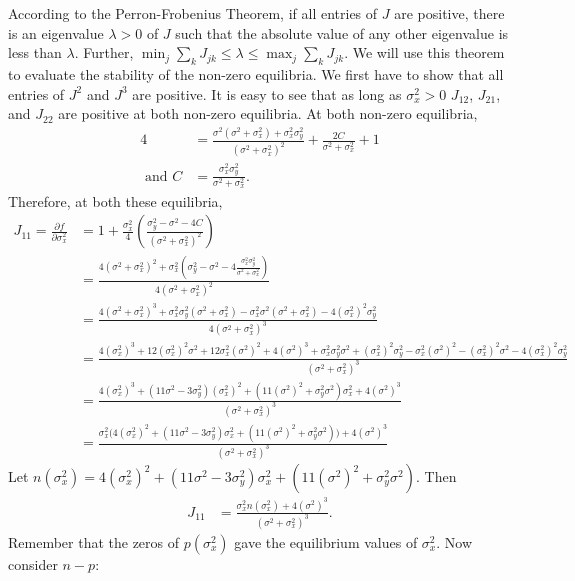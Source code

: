 \documentclass{article}
\begin{document}
\begin{enumerate}
According to the Perron-Frobenius Theorem, if all entries of $J$ are positive, there is an eigenvalue $\lambda>0$ of $J$ such that the absolute value of any other eigenvalue is less than $\lambda$. Further, $\min_j\sum_k J_{jk}\leq \lambda\leq \max_j\sum_k J_{jk}$. We will use this theorem to evaluate the stability of the non-zero equilibria. We first have to show that all entries of $J^2$ and $J^3$ are positive. It is easy to see that as long as $\sigma_x^2>0$ $J_{12}$, $J_{21}$, and $J_{22}$ are positive at both non-zero equilibria. At both non-zero equilibria,
\begin{align*}
4&=\frac{\sigma^2(\sigma^2+\sigma_x^2)+\sigma_x^2\sigma_y^2}{(\sigma^2+\sigma_x^2)^2}+\frac{2C}{\sigma^2+\sigma_x^2}+1
\\ \text{ and } C &=\frac{\sigma_x^2\sigma_y^2}{\sigma^2+\sigma_x^2}.
\end{align*}
Therefore, at both these equilibria, 
\begin{align*}
J_{11}=\frac{\partial f}{\partial \sigma_x^2}&= 1 + \frac{\sigma_x^2}{4}\left(\frac{\sigma_y^2-\sigma^2-4C}{(\sigma^2+\sigma_x^2)^2}\right)
\\&=\frac{4(\sigma^2+\sigma_x^2)^2+\sigma_x^2\left(\sigma_y^2-\sigma^2-4\frac{\sigma_x^2\sigma_y^2}{\sigma^2+\sigma_x^2}\right)}{4(\sigma^2+\sigma_x^2)^2}
\\&=\frac{4(\sigma^2+\sigma_x^2)^3+\sigma_x^2\sigma_y^2(\sigma^2+\sigma_x^2)-\sigma_x^2\sigma^2(\sigma^2+\sigma_x^2)-4(\sigma_x^2)^2\sigma_y^2}{4(\sigma^2+\sigma_x^2)^3}
\\&=\frac{4(\sigma_x^2)^3+12(\sigma_x^2)^2\sigma^2+12\sigma_x^2(\sigma^2)^2+4(\sigma^2)^3+\sigma_x^2\sigma_y^2\sigma^2+(\sigma_x^2)^2\sigma_y^2-\sigma_x^2(\sigma^2)^2-(\sigma_x^2)^2\sigma^2-4(\sigma_x^2)^2\sigma_y^2}{(\sigma^2+\sigma_x^2)^3}
\\&=\frac{4(\sigma_x^2)^3+(11\sigma^2-3\sigma_y^2)(\sigma_x^2)^2+(11(\sigma^2)^2+\sigma_y^2\sigma^2)\sigma_x^2+4(\sigma^2)^3}{(\sigma^2+\sigma_x^2)^3}
\\&=\frac{\sigma_x^2\big(4(\sigma_x^2)^2+(11\sigma^2-3\sigma_y^2)\sigma_x^2+(11(\sigma^2)^2+\sigma_y^2\sigma^2)\big)+4(\sigma^2)^3}{(\sigma^2+\sigma_x^2)^3}
\end{align*}
Let
$n(\sigma_x^2)=4(\sigma_x^2)^2+(11\sigma^2-3\sigma_y^2)\sigma_x^2+(11(\sigma^2)^2+\sigma_y^2\sigma^2)$. Then 
\begin{align*}
J_{11}&=\frac{\sigma_x^2n(\sigma_x^2)+4(\sigma^2)^3}{(\sigma^2+\sigma_x^2)^3}.
\end{align*}
Remember that the zeros of $p(\sigma_x^2)$ gave the equilibrium values of $\sigma_x^2$. Now consider $n-p:$

\end{enumerate}
\end{document}
